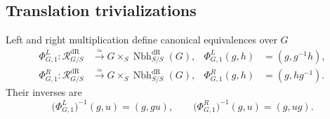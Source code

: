 \subsection{Translation trivializations}

\begin{theorem}
\label{thm:group-translation}
Left and right multiplication define canonical equivalences over $G$
\[
\begin{aligned}
    \Phi^L_{G,1}:
    \mathcal R^{\mathrm{dR}}_{G/S}
    &\xrightarrow{\simeq}
    G\times_S\operatorname{Nbh}^{\mathrm{dR}}_{S/S}(G),
    &
    \Phi^L_{G,1}(g,h)&=(g,g^{-1}h),
\\
    \Phi^R_{G,1}:
    \mathcal R^{\mathrm{dR}}_{G/S}
    &\xrightarrow{\simeq}
    G\times_S\operatorname{Nbh}^{\mathrm{dR}}_{S/S}(G),
    &
    \Phi^R_{G,1}(g,h)&=(g,hg^{-1}).
\end{aligned}
\]
Their inverses are
\[
    \bigl(\Phi^L_{G,1}\bigr)^{-1}(g,u)=(g,gu),
    \qquad
    \bigl(\Phi^R_{G,1}\bigr)^{-1}(g,u)=(g,ug).
\]
\end{theorem}

